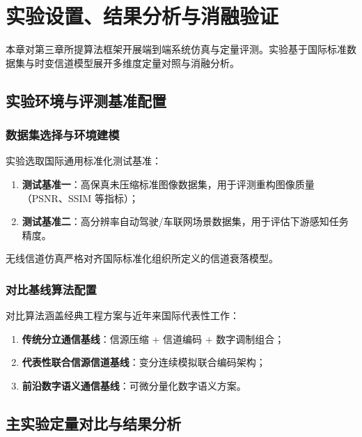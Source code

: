 \chapter{实验设置、结果分析与消融验证}
\label{chap:experiments}

本章对第三章所提算法框架开展端到端系统仿真与定量评测。实验基于国际标准数据集与时变信道模型展开多维度定量对照与消融分析。

\section{实验环境与评测基准配置}

\subsection{数据集选择与环境建模}
实验选取国际通用标准化测试基准：
\begin{enumerate}
  \item \textbf{测试基准一}：高保真未压缩标准图像数据集，用于评测重构图像质量（PSNR、SSIM 等指标）；
  \item \textbf{测试基准二}：高分辨率自动驾驶/车联网场景数据集，用于评估下游感知任务精度。
\end{enumerate}

无线信道仿真严格对齐国际标准化组织所定义的信道衰落模型。

\subsection{对比基线算法配置}
对比算法涵盖经典工程方案与近年来国际代表性工作：
\begin{enumerate}
  \item \textbf{传统分立通信基线}：信源压缩 + 信道编码 + 数字调制组合；
  \item \textbf{代表性联合信源信道基线}：变分连续模拟联合编码架构；
  \item \textbf{前沿数字语义通信基线}：可微分量化数字语义方案。
\end{enumerate}

\section{主实验定量对比与结果分析}

